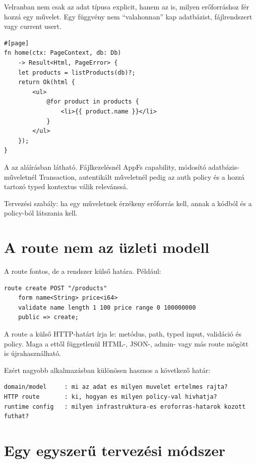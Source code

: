 Velranban nem csak az adat típusa explicit, hanem az is, milyen erőforráshoz fér hozzá egy művelet. Egy függvény nem ``valahonnan'' kap adatbázist, fájlrendszert vagy current usert.

\begin{lstlisting}[language=Velran]
#[page]
fn home(ctx: PageContext, db: Db)
    -> Result<Html, PageError> {
    let products = listProducts(db)?;
    return Ok(html {
        <ul>
            @for product in products {
                <li>{{ product.name }}</li>
            }
        </ul>
    });
}
\end{lstlisting}

A  az aláírásban látható. Fájlkezelésnél AppFs capability, módosító adatbázis-műveletnél Transaction, autentikált műveletnél pedig az auth policy és a hozzá tartozó typed kontextus válik relevánssá.

Tervezési szabály: ha egy műveletnek érzékeny erőforrás kell, annak a kódból és a policy-ból látszania kell.

\section{A route nem az üzleti modell}

A route fontos, de a rendszer külső határa. Például:

\begin{lstlisting}[language=Velran]
route create POST "/products"
    form name<String> price<i64>
    validate name length 1 100 price range 0 100000000
    public => create;
\end{lstlisting}

A route a külső HTTP-határt írja le: metódus, path, typed input, validáció és policy. Maga a  ettől függetlenül HTML-, JSON-, admin- vagy más route mögött is újrahasználható.

Ezért nagyobb alkalmazásban különösen hasznos a következő határ:

\begin{lstlisting}
domain/model     : mi az adat es milyen muvelet ertelmes rajta?
HTTP route       : ki, hogyan es milyen policy-val hivhatja?
runtime config   : milyen infrastruktura-es eroforras-hatarok kozott futhat?
\end{lstlisting}

\section{Egy egyszerű tervezési módszer}

